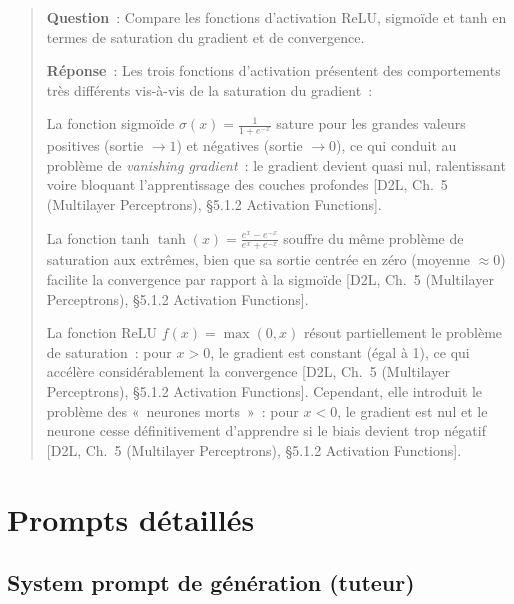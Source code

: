 \documentclass[11pt,a4paper]{article}
\begin{document}
\begin{quote}
\textbf{Question}~: Compare les fonctions d'activation ReLU, sigmoïde et tanh en termes de saturation du gradient et de convergence.

\textbf{Réponse}~: Les trois fonctions d'activation présentent des comportements très différents vis-à-vis de la saturation du gradient~:

La fonction sigmoïde $\sigma(x) = \frac{1}{1+e^{-x}}$ sature pour les grandes valeurs positives (sortie $\to 1$) et négatives (sortie $\to 0$), ce qui conduit au problème de \textit{vanishing gradient}~: le gradient devient quasi nul, ralentissant voire bloquant l'apprentissage des couches profondes [D2L, Ch.~5 (Multilayer Perceptrons), \S{}5.1.2 Activation Functions].

La fonction tanh $\tanh(x) = \frac{e^x - e^{-x}}{e^x + e^{-x}}$ souffre du même problème de saturation aux extrêmes, bien que sa sortie centrée en zéro (moyenne $\approx 0$) facilite la convergence par rapport à la sigmoïde [D2L, Ch.~5 (Multilayer Perceptrons), \S{}5.1.2 Activation Functions].

La fonction ReLU $f(x) = \max(0, x)$ résout partiellement le problème de saturation~: pour $x > 0$, le gradient est constant (égal à 1), ce qui accélère considérablement la convergence [D2L, Ch.~5 (Multilayer Perceptrons), \S{}5.1.2 Activation Functions]. Cependant, elle introduit le problème des «~neurones morts~»~: pour $x < 0$, le gradient est nul et le neurone cesse définitivement d'apprendre si le biais devient trop négatif [D2L, Ch.~5 (Multilayer Perceptrons), \S{}5.1.2 Activation Functions].
\end{quote}

\section{Prompts détaillés}
\label{app:prompts}

\subsection*{System prompt de génération (tuteur)}
\end{document}

